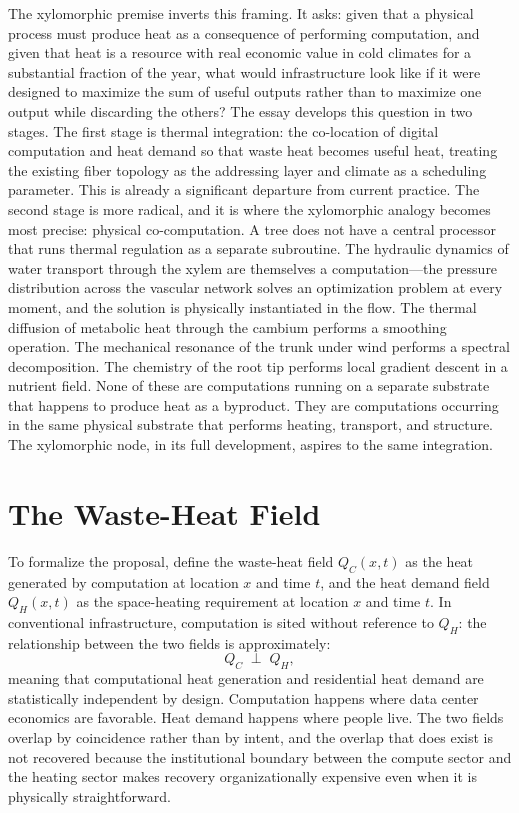 \documentclass[12pt, oneside]{article}
\begin{document}
The xylomorphic premise inverts this framing. It asks: given that a physical process must produce heat as a consequence of performing computation, and given that heat is a resource with real economic value in cold climates for a substantial fraction of the year, what would infrastructure look like if it were designed to maximize the sum of useful outputs rather than to maximize one output while discarding the others? The essay develops this question in two stages. The first stage is thermal integration: the co-location of digital computation and heat demand so that waste heat becomes useful heat, treating the existing fiber topology as the addressing layer and climate as a scheduling parameter. This is already a significant departure from current practice. The second stage is more radical, and it is where the xylomorphic analogy becomes most precise: physical co-computation. A tree does not have a central processor that runs thermal regulation as a separate subroutine. The hydraulic dynamics of water transport through the xylem are themselves a computation---the pressure distribution across the vascular network solves an optimization problem at every moment, and the solution is physically instantiated in the flow. The thermal diffusion of metabolic heat through the cambium performs a smoothing operation. The mechanical resonance of the trunk under wind performs a spectral decomposition. The chemistry of the root tip performs local gradient descent in a nutrient field. None of these are computations running on a separate substrate that happens to produce heat as a byproduct. They are computations occurring in the same physical substrate that performs heating, transport, and structure. The xylomorphic node, in its full development, aspires to the same integration.

\section{The Waste-Heat Field}

To formalize the proposal, define the waste-heat field $Q_C(x,t)$ as the heat generated by computation at location $x$ and time $t$, and the heat demand field $Q_H(x,t)$ as the space-heating requirement at location $x$ and time $t$. In conventional infrastructure, computation is sited without reference to $Q_H$: the relationship between the two fields is approximately:
\[
Q_C \;\perp\; Q_H,
\]
meaning that computational heat generation and residential heat demand are statistically independent by design. Computation happens where data center economics are favorable. Heat demand happens where people live. The two fields overlap by coincidence rather than by intent, and the overlap that does exist is not recovered because the institutional boundary between the compute sector and the heating sector makes recovery organizationally expensive even when it is physically straightforward.
\end{document}
